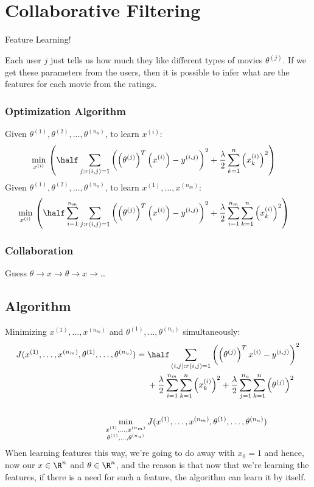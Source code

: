 \section{Collaborative Filtering}
Feature Learning!

Each user $j$ just tells us how much they like different types of movies $\theta^{(j)}$.
If we get these parameters from the users, then it is possible to infer what are the
features for each movie from the ratings.

\subsubsection{Optimization Algorithm}
Given $\theta^{(1)}, \theta^{(2)}, \dots, \theta^{(n_u)}$, to learn $x^{(i)}$:
\begin{align*}
	\min_{x^{(i)}} {} & \left(
	\half\sum_{j: r(i, j) = 1}\left(
	\left(\theta^{(j)}\right)^T\left(x^{(i)}\right) - y^{(i,j)}
	\right)^2 + \frac{\lambda}{2}\sum_{k=1}^n\left(
	x_k^{(i)}
	\right)^2
	\right)
\end{align*}
Given $\theta^{(1)}, \theta^{(2)}, \dots, \theta^{(n_u)}$,
to learn $x^{(1)}, \dots, x^{(n_m)}$:
\begin{align*}
	\min_{x^{(i)}} {} & \left(
	\half\sum_{i=1}^{n_m}\sum_{j: r(i, j) = 1}\left(
	\left(\theta^{(j)}\right)^T\left(x^{(i)}\right) - y^{(i,j)}
	\right)^2 + \frac{\lambda}{2}\sum_{i=1}^{n_m}\sum_{k=1}^n\left(
	x_k^{(i)}
	\right)^2
	\right)
\end{align*}

\subsubsection{Collaboration}
Guess $\theta \to x \to \theta \to x \to $\dots

\subsection{Algorithm}
Minimizing $x^{(1)}, \dots, x^{(n_m)}$ and $\theta^{(1)}, \dots, \theta^{(n_u)}$
simultaneously:
\begin{align*}
	J(x^{(1)}, \dots, x^{(n_m)}, \theta^{(1)}, \dots, \theta^{(n_u)})
	={}   &
	\half\sum_{(i, j):r(i, j) = 1}\left(
	\left(\theta^{(j)}\right)^Tx^{(i)} - y^{(i, j)}
	\right)^2                                                                       \\
	      & + \frac{\lambda}{2}\sum_{i=1}^{n_m}\sum_{k=1}^n\left(x_k^{(i)}\right)^2
	+ \frac{\lambda}{2}\sum_{j=1}^{n_u}\sum_{k=1}^n\left(\theta^{(j)}\right)^2      \\ \\
	\min_{\substack{
	x^{(1)}, \dots, x^{(n_m)}                                                       \\
			\theta^{(1)}, \dots, \theta^{(n_u)}
	}} {} & J(x^{(1)}, \dots, x^{(n_m)}, \theta^{(1)}, \dots, \theta^{(n_u)})
\end{align*}
When learning features this way, we're going to do away with $x_0 = 1$ and hence, now
our $x \in \R^n$ and $\theta \in \R^n$, and the reason is that now that we're learning
the features, if there is a need for such a feature, the algorithm can learn it by itself.


